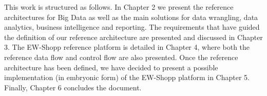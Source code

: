 This work is structured as follows. In Chapter 2 we present the reference architectures for Big Data as well as the main solutions for data wrangling, data analytics, business intelligence and reporting. The requirements that have guided the definition of our reference architecture are presented and discussed in Chapter 3. The EW-Shopp reference platform is detailed in Chapter 4, where both the reference data flow and control flow are also presented. Once the reference architecture has been defined, we have decided to present a possible implementation (in embryonic form) of the EW-Shopp platform in Chapter 5. Finally, Chapter 6 concludes the document. 








